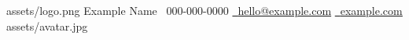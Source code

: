 \resumeHeader
  {assets/logo.png}
  {Example Name}
  {~000-000-0000 \hspace{1.5em}
   \href{mailto:hello@example.com}{~\uline{hello@example.com}} \hspace{1.5em}
   \href{https://example.com}{~\uline{example.com}}}
  {assets/avatar.jpg}
